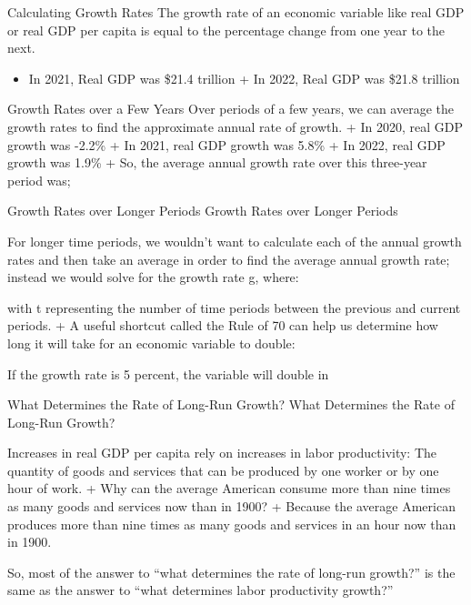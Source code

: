 \documentclass[
  12pt,
  ignorenonframetext,
]{beamer}
\providecommand{\tightlist}{%
  \setlength{\itemsep}{0pt}\setlength{\parskip}{0pt}}
\begin{document}
\begin{frame}{Calculating Growth Rates}
\protect\hypertarget{calculating-growth-rates}{}
The growth rate of an economic variable like real GDP or real GDP per
capita is equal to the percentage change from one year to the next.

\begin{itemize}
\tightlist
\item
  In 2021, Real GDP was \$21.4 trillion + In 2022, Real GDP was \$21.8
  trillion
\end{itemize}
\end{frame}

\begin{frame}{Growth Rates over a Few Years}
\protect\hypertarget{growth-rates-over-a-few-years}{}
Over periods of a few years, we can average the growth rates to find the
approximate annual rate of growth. + In 2020, real GDP growth was -2.2\%
+ In 2021, real GDP growth was 5.8\% + In 2022, real GDP growth was
1.9\% + So, the average annual growth rate over this three-year period
was;
\end{frame}

\begin{frame}{Growth Rates over Longer Periods}
\protect\hypertarget{growth-rates-over-longer-periods}{}
Growth Rates over Longer Periods

For longer time periods, we wouldn't want to calculate each of the
annual growth rates and then take an average in order to find the
average annual growth rate; instead we would solve for the growth rate
g, where:

with t representing the number of time periods between the previous and
current periods. + A useful shortcut called the Rule of 70 can help us
determine how long it will take for an economic variable to double:

If the growth rate is 5 percent, the variable will double in
\end{frame}

\begin{frame}{What Determines the Rate of Long-Run Growth?}
\protect\hypertarget{what-determines-the-rate-of-long-run-growth}{}
What Determines the Rate of Long-Run Growth?

Increases in real GDP per capita rely on increases in labor
productivity: The quantity of goods and services that can be produced by
one worker or by one hour of work. + Why can the average American
consume more than nine times as many goods and services now than in
1900? + Because the average American produces more than nine times as
many goods and services in an hour now than in 1900.

So, most of the answer to ``what determines the rate of long-run
growth?'' is the same as the answer to ``what determines labor
productivity growth?''
\end{frame}
\end{document}
